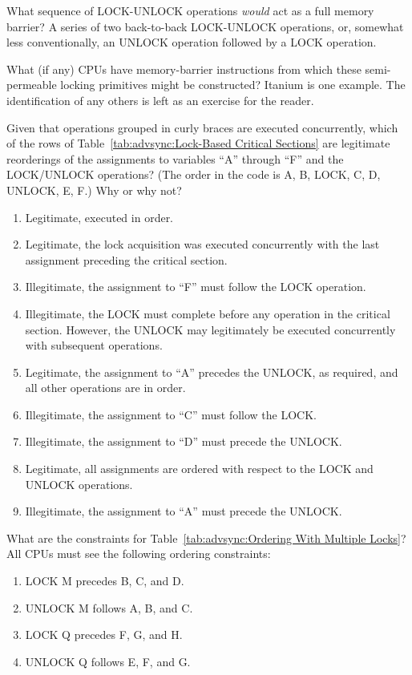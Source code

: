\QuickQ{}
	What sequence of LOCK-UNLOCK operations \emph{would}
	act as a full memory barrier?
\QuickA{}
	A series of two back-to-back LOCK-UNLOCK operations, or, somewhat
	less conventionally, an UNLOCK operation followed by a LOCK
	operation.

\QuickQ{}
	What (if any) CPUs have memory-barrier instructions
	from which these semi-permeable locking primitives might
	be constructed?
\QuickA{}
	Itanium is one example.
	The identification of any others is left as an
	exercise for the reader.

\QuickQ{}
	Given that operations grouped in curly braces are executed
	concurrently, which of the rows of
	Table~\ref{tab:advsync:Lock-Based Critical Sections}
	are legitimate reorderings of the assignments to variables
	``A'' through ``F'' and the LOCK/UNLOCK operations?
	(The order in the code is A, B, LOCK, C, D, UNLOCK, E, F.)
	Why or why not?
\QuickA{}
	\begin{enumerate}
	\item	Legitimate, executed in order.
	\item	Legitimate, the lock acquisition was executed concurrently
		with the last assignment preceding the critical section.
	\item	Illegitimate, the assignment to ``F'' must follow the LOCK
		operation.
	\item	Illegitimate, the LOCK must complete before any operation in
		the critical section.  However, the UNLOCK may legitimately
		be executed concurrently with subsequent operations.
	\item	Legitimate, the assignment to ``A'' precedes the UNLOCK,
		as required, and all other operations are in order.
	\item	Illegitimate, the assignment to ``C'' must follow the LOCK.
	\item	Illegitimate, the assignment to ``D'' must precede the UNLOCK.
	\item	Legitimate, all assignments are ordered with respect to the
		LOCK and UNLOCK operations.
	\item	Illegitimate, the assignment to ``A'' must precede the UNLOCK.
	\end{enumerate}

\QuickQ{}
	What are the constraints for
	Table~\ref{tab:advsync:Ordering With Multiple Locks}?
\QuickA{}
	All CPUs must see the following ordering constraints:
	\begin{enumerate}
	\item	LOCK M precedes B, C, and D.
	\item	UNLOCK M follows A, B, and C.
	\item	LOCK Q precedes F, G, and H.
	\item	UNLOCK Q follows E, F, and G.
	\end{enumerate}

